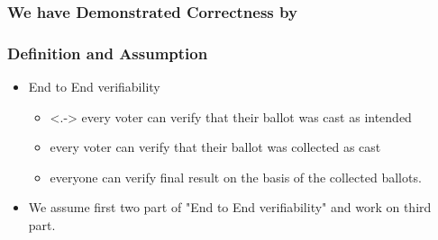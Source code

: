 \documentclass{beamer}
\begin{document}
\begin{frame}
\frametitle{We have Demonstrated Correctness by}
\begin{center}
\end{center}

\end{frame}


\begin{frame}
\frametitle{Definition and Assumption}

\begin{itemize}[]
\item End to End verifiability
\begin{itemize}
  \item<.-> every voter can verify that their ballot was cast as
  intended
  \item every voter can verify that their ballot was collected as
  cast
  \item everyone can verify final result on the basis of the
  collected ballots.
\end{itemize}

\item We assume first two part of "End to End verifiability" and work on
      third part.

\end{itemize}
\end{frame}
\end{document}
